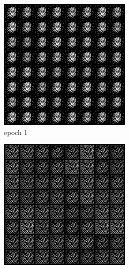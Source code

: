 \documentclass[a4paper]{article}
\theoremstyle{definition}
\newenvironment{soln}{
	\leavevmode\color{blue}\ignorespaces
}{}
\begin{document}
\begin{enumerate} [label=(\alph*)]
\begin{soln}
    		\begin{figure}[H]
    			\centering
    			\begin{subfigure}[b]{0.3\textwidth}
    				\centering
    				\includegraphics[width=\textwidth]{hw6/1.b/1_b_gen_img1.png}
    				\caption{epoch 1}
    			\end{subfigure}
    			\hfill
    			\begin{subfigure}[b]{0.3\textwidth}
    				\centering
    				\includegraphics[width=\textwidth]{hw6/1.b/1_b_gen_img50.png}

\end{subfigure}
\end{figure}
\end{soln}
\end{enumerate}
\end{document}
